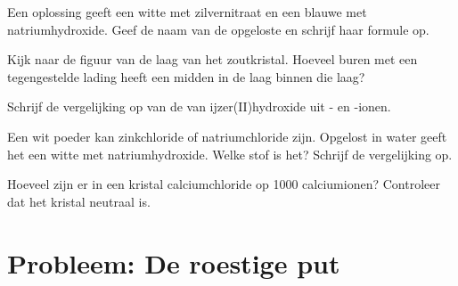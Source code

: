\begin{exercise}[$\star\star$]\label{exo:g9:ions:8}
Een oplossing geeft een witte  met zilvernitraat en een blauwe
met natriumhydroxide. Geef de naam van de opgeloste  en
schrijf haar formule op.
\end{exercise}

\begin{exercise}[$\star\star$]\label{exo:g9:ions:9}
Kijk naar de figuur van de laag van het zoutkristal. Hoeveel buren met
een tegengestelde lading heeft een  midden in de laag binnen die
laag?
\end{exercise}

\begin{exercise}[$\star\star$]\label{exo:g9:ions:10}
Schrijf de vergelijking op van de  van ijzer(II)hydroxide
uit - en -ionen.
\end{exercise}

\begin{exercise}[$\star\star\star$]\label{exo:g9:ions:11}
Een wit poeder kan zinkchloride of natriumchloride zijn. Opgelost in
water geeft het een witte  met natriumhydroxide. Welke stof is
het? Schrijf de vergelijking op.
\end{exercise}

\begin{exercise}[$\star\star\star$]\label{exo:g9:ions:12}
Hoeveel  zijn er in een kristal calciumchloride op 1000
calciumionen? Controleer dat het kristal neutraal is.
\end{exercise}

\section{Probleem: De roestige put}

